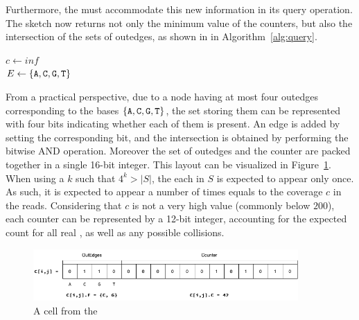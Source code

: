 \begin{algorithm}[htbp]
    \caption{$C.\mathit{add\_outedge}(X, a)$}\label{alg:addOutEdge}
\end{algorithm}

Furthermore, the \dBCM must accommodate this new information in its query operation. The sketch now returns not only the minimum value of the counters, but also the intersection of the sets of outedges, as shown in in Algorithm~\ref{alg:query}.

\begin{algorithm}
	\caption{$C.\mathit{query}(X)$}\label{alg:query}
	$c \gets \mathit{inf}$\\
	$E \gets \{\mathtt{A}, \mathtt{C}, \mathtt{G}, \mathtt{T}\}$\\
\end{algorithm}

From a practical perspective, due to a node having at most four outedges corresponding to the bases $\{\mathtt{A}, \mathtt{C}, \mathtt{G}, \mathtt{T}\}$, the set storing them can be represented with four bits indicating whether each of them is present. An edge is added by setting the corresponding bit, and the intersection is obtained by performing the bitwise AND operation. Moreover the set of outedges and the counter are packed together in a single 16-bit integer. This layout can be visualized in Figure~\ref{fig:dbcm-bit_use}. When using a $k$ such that $4^k > |S|$, the each \kmer in $S$ is expected to appear only once. As such, it is expected to appear a number of times equals to the coverage $c$ in the reads. Considering that $c$ is not a very high value (commonly below $200$), each counter can be represented by a 12-bit integer, accounting for the expected count for all real , as well as any possible collisions.

\begin{figure}[htbp]
  \centering
  \includegraphics[width=0.9\textwidth]{figures/dbcm-bit_use}
  \caption{A cell from the \dBCM}\label{fig:dbcm-bit_use}
\end{figure}

